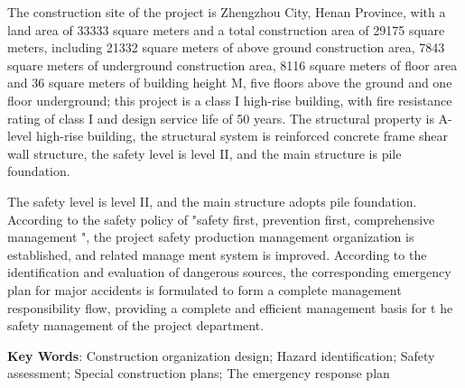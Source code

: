     The construction site of the project is Zhengzhou City, Henan Province, with a land area of 33333 square meters and a total construction area of 29175 square meters, 
    including 21332 square meters of above ground construction area, 7843 square meters of underground construction area, 8116 square meters of floor area and 36 square 
    meters of building height M, five floors above the ground and one floor underground; this project is a class I high-rise building, with fire resistance rating of 
    class I and design service life of 50 years. The structural property is A-level high-rise building, the structural system is reinforced concrete frame shear wall 
    structure, the safety level is level II, and the main structure is pile foundation.
    
    The safety level is level II, and the main structure adopts pile foundation.
   According to the safety policy of "safety first, prevention first, comprehensive management ", the project safety production management 
   organization is established, and related manage ment system is improved. According to the identification and evaluation of dangerous sources,
    the corresponding emergency plan for major accidents is formulated to form a complete management responsibility flow, providing a complete 
    and efficient management basis for t he safety management of the project department.


{  \textbf{Key Words}: Construction organization design; Hazard identification; Safety assessment; Special construction plans; The emergency response plan}
\pagestyle{plain}



\newpage
\begin{center}
\tableofcontents %
\thispagestyle{plain}
\end{center}
